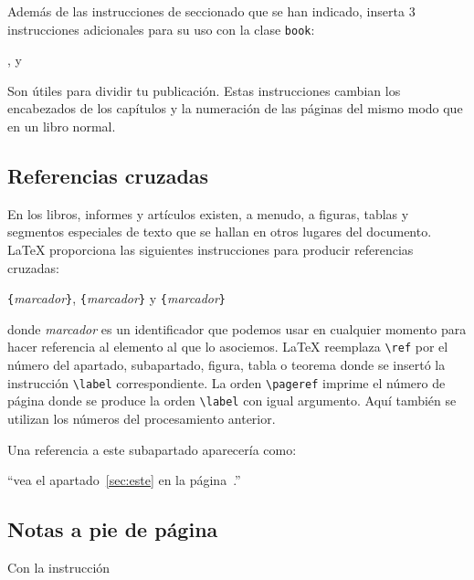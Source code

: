 Además  de  las  instrucciones  de seccionado  que  se  han  indicado,
\LaTeXe{} inserta 3 instrucciones adicionales para su uso con la clase
\verb|book|:

\begin{command}
,  y 
\end{command}

\noindent Son útiles para  dividir tu publicación. Estas instrucciones
cambian  los encabezados  de  los  capítulos y  la  numeración de  las
páginas del mismo modo que en un libro normal.

\subsection{Referencias cruzadas}

En los libros, informes y artículos existen, a menudo,  a  figuras, tablas  y segmentos especiales  de texto  que se
hallan  en  otros  lugares  del documento.  \LaTeX{}  proporciona  las
siguientes instrucciones para producir referencias cruzadas:

\begin{command}
  \verb|{|\emph{marcador}\verb|}|,
  \verb|{|\emph{marcador}\verb|}| y
  \verb|{|\emph{marcador}\verb|}|
\end{command}

\noindent donde  \emph{marcador} es un identificador  que podemos usar
en  cualquier momento  para hacer  referencia  al elemento  al que  lo
asociemos. \LaTeX{} reemplaza \verb|\ref|  por el número del apartado,
subapartado, figura, tabla  o teorema donde se  insertó la instrucción
\verb|\label|  correspondiente. La  orden  \verb|\pageref| imprime  el
número de  página donde  se produce la  orden \verb|\label|  con igual
argumento.  Aquí también  se  utilizan los  números del  procesamiento
anterior.

\begin{example}
Una referencia a este subapartado
\label{sec:este} aparecería como:

``vea el apartado~\ref{sec:este} en
la página~\pageref{sec:este}.''
\end{example}
 
\subsection{Notas a pie de página}

Con la instrucción

